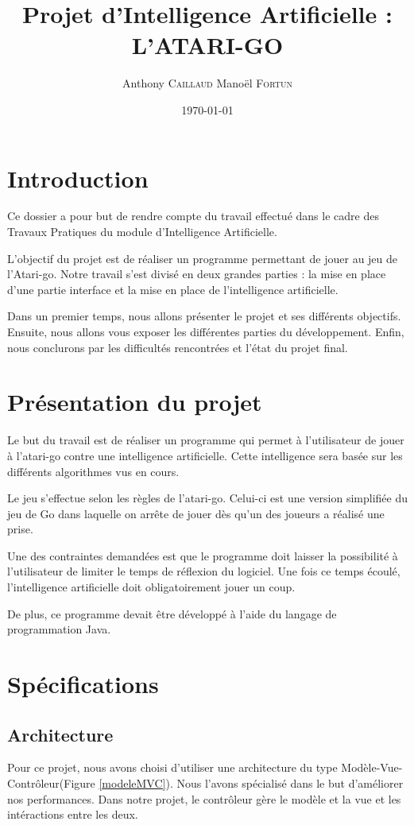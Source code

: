\documentclass[11pt,a4paper]{article}
\title{Projet d'Intelligence Artificielle : L'ATARI-GO}
\author{Anthony \textsc{Caillaud} Manoël \textsc{Fortun}}
\date{\today}
\begin{document}
	\maketitle
	\clearpage
	\tableofcontents
	\clearpage

\section{Introduction}
Ce dossier a pour but de rendre compte du travail effectué dans le cadre des
Travaux Pratiques du module d'Intelligence Artificielle.

 L'objectif du projet est de réaliser un programme permettant de jouer au jeu
 de l'Atari-go. Notre travail s'est divisé en deux grandes parties : 
 la mise en place d'une partie interface et la mise en place de l'intelligence 
 artificielle.

Dans un premier temps, nous allons présenter le projet et ses
différents objectifs. Ensuite, nous allons vous exposer les
différentes parties du développement. Enfin, nous conclurons par les
difficultés rencontrées et l'état du projet final.

\section{Présentation du projet}
Le but du travail est de réaliser un programme qui permet à l'utilisateur de
jouer à l’atari-go contre une intelligence artificielle. Cette intelligence
sera basée sur les différents algorithmes vus en cours.

Le jeu s'effectue selon les règles de l'atari-go. Celui-ci est une version
simplifiée du jeu de Go dans laquelle on arrête de jouer dès qu’un des joueurs
a réalisé une prise.

Une des contraintes demandées est que le programme doit laisser la possibilité
à l'utilisateur de limiter le temps de réflexion du logiciel. Une
fois ce temps écoulé, l'intelligence artificielle doit obligatoirement jouer un
coup.

De plus, ce programme devait être développé à l'aide du langage de
programmation Java.
\clearpage
\section{Spécifications}
	\subsection{Architecture}
	Pour ce projet, nous avons choisi d'utiliser une architecture du type
	Modèle-Vue-Contrôleur(Figure \ref{modeleMVC}). Nous l'avons spécialisé dans le
	but d'améliorer nos performances. Dans notre projet, le contrôleur gère le
	modèle et la vue et les intéractions entre les deux.
	
\end{document}
